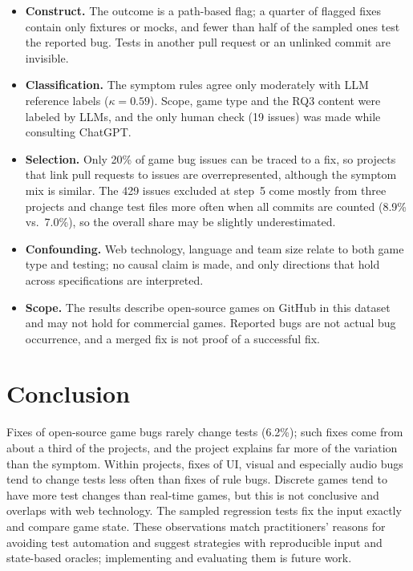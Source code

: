 \documentclass[10pt,twocolumn,a4paper]{article}
\begin{document}
\begin{itemize}
\item \textbf{Construct.} The outcome is a path-based flag; a quarter of flagged fixes contain only fixtures or mocks, and fewer than half of the sampled ones test the reported bug. Tests in another pull request or an unlinked commit are invisible.
\item \textbf{Classification.} The symptom rules agree only moderately with LLM reference labels ($\kappa=0.59$). Scope, game type and the RQ3 content were labeled by LLMs, and the only human check (19 issues) was made while consulting ChatGPT.
\item \textbf{Selection.} Only 20\% of game bug issues can be traced to a fix, so projects that link pull requests to issues are overrepresented, although the symptom mix is similar. The 429 issues excluded at step~5 come mostly from three projects and change test files more often when all commits are counted (8.9\% vs.\ 7.0\%), so the overall share may be slightly underestimated.
\item \textbf{Confounding.} Web technology, language and team size relate to both game type and testing; no causal claim is made, and only directions that hold across specifications are interpreted.
\item \textbf{Scope.} The results describe open-source games on GitHub in this dataset and may not hold for commercial games. Reported bugs are not actual bug occurrence, and a merged fix is not proof of a successful fix.
\end{itemize}

\section{Conclusion}
Fixes of open-source game bugs rarely change tests (6.2\%); such fixes come from about a third of the projects, and the project explains far more of the variation than the symptom.
Within projects, fixes of UI, visual and especially audio bugs tend to change tests less often than fixes of rule bugs.
Discrete games tend to have more test changes than real-time games, but this is not conclusive and overlaps with web technology.
The sampled regression tests fix the input exactly and compare game state.
These observations match practitioners' reasons for avoiding test automation and suggest strategies with reproducible input and state-based oracles; implementing and evaluating them is future work.
\end{document}
